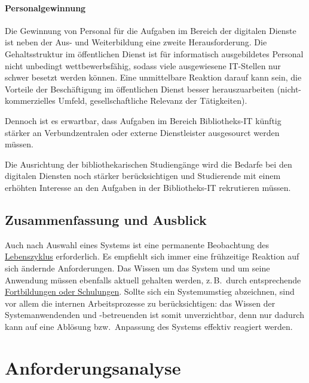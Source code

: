 \documentclass[
  11pt,
  letterpaper,
  DIV=11,
  twoside]{scrreprt}
\begin{document}
\subsubsection{Personalgewinnung}\label{personalgewinnung}

Die Gewinnung von Personal für die Aufgaben im Bereich der digitalen
Dienste ist neben der Aus- und Weiterbildung eine zweite
Herausforderung. Die Gehaltsstruktur im öffentlichen Dienst ist für
informatisch ausgebildetes Personal nicht unbedingt wettbewerbsfähig,
sodass viele ausgewiesene IT-Stellen nur schwer besetzt werden können.
Eine unmittelbare Reaktion darauf kann sein, die Vorteile der
Beschäftigung im öffentlichen Dienst besser herauszuarbeiten
(nicht-kommerzielles Umfeld, gesellschaftliche Relevanz der
Tätigkeiten).

Dennoch ist es erwartbar, dass Aufgaben im Bereich Bibliotheks-IT
künftig stärker an Verbundzentralen oder externe Dienstleister
ausgesourct werden müssen.

Die Ausrichtung der bibliothekarischen Studiengänge wird die Bedarfe bei
den digitalen Diensten noch stärker berücksichtigen und Studierende mit
einem erhöhten Interesse an den Aufgaben in der Bibliotheks-IT
rekrutieren müssen.

\section{Zusammenfassung und
Ausblick}\label{zusammenfassung-und-ausblick-1}

Auch nach Auswahl eines Systems ist eine permanente Beobachtung des
\hyperref[it-lebenszyklus]{Lebenszyklus} erforderlich. Es empfiehlt sich
immer eine frühzeitige Reaktion auf sich ändernde Anforderungen. Das
Wissen um das System und um seine Anwendung müssen ebenfalls aktuell
gehalten werden, z.\,B.~durch entsprechende
\hyperref[aus--und-weiterbildung]{Fortbildungen oder Schulungen}. Sollte
sich ein Systemumstieg abzeichnen, sind vor allem die internen
Arbeitsprozesse zu berücksichtigen: das Wissen der Systemanwendenden und
-betreuenden ist somit unverzichtbar, denn nur dadurch kann auf eine
Ablösung bzw.~Anpassung des Systems effektiv reagiert werden.


\chapter{Anforderungsanalyse}\label{sec-anforderungen}
\end{document}
